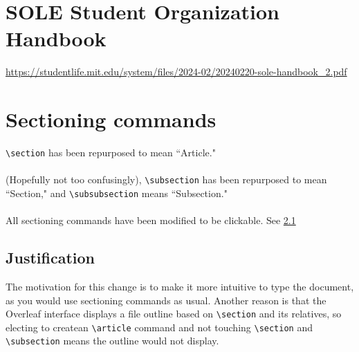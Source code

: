 \documentclass[12pt]{article}
\begin{document}
\section{SOLE Student Organization Handbook}
\url{https://studentlife.mit.edu/system/files/2024-02/20240220-sole-handbook_2.pdf}

\section{Sectioning commands}
\verb|\section| has been repurposed to mean ``Article."
\\
\\
(Hopefully not too confusingly), \verb|\subsection| has been repurposed to mean ``Section," and \verb|\subsubsection| means ``Subsection."
\\
\\
All sectioning commands have been modified to be clickable.
See \ref{justification}

\subsection{Justification}
\label{justification}
The motivation for this change is to make it more intuitive to type the document, as you would use sectioning commands as usual.
Another reason is that the Overleaf interface displays a file outline based on \verb|\section| and its relatives, so electing to createan \verb|\article| command and not touching \verb|\section| and \verb|\subsection| means the outline would not display.
\end{document}
